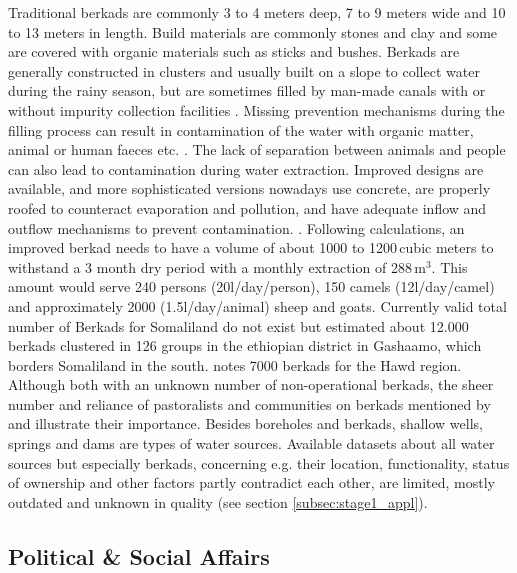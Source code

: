 Traditional berkads are commonly 3 to 4 meters deep, 7 to 9 meters wide and 10 to 13 meters in length. Build materials are commonly stones and clay and some are covered with organic materials such as sticks and bushes. Berkads are generally constructed in clusters and usually built on a slope to collect water during the rainy season, but are sometimes filled by man-made canals with or without impurity collection facilities \autocite{walkerChangingPastoralismEthiopian1998}. Missing prevention mechanisms during the filling process can result in contamination of the water with organic matter, animal or human faeces etc. \autocite{mercycorpsIMPROVEDBERKADDESIGNS2017}. The lack of separation between animals and people can also lead to contamination during water extraction. Improved designs are available, and more sophisticated versions nowadays use concrete, are properly roofed to counteract evaporation and pollution, and have adequate inflow and outflow mechanisms to prevent contamination. \autocite{mercycorpsIMPROVEDBERKADDESIGNS2017, petrucciLandscapeLandformsNorthern2022}. Following \autocite{mercycorpsIMPROVEDBERKADDESIGNS2017} calculations, an improved berkad needs to have a volume of about 1000 to 1200\,cubic meters to withstand a 3 month dry period with a monthly extraction of 288\,m$^3$. This amount would serve 240 persons (20l/day/person), 150 camels (12l/day/camel) and approximately 2000 (1.5l/day/animal) sheep and goats. Currently valid total number of Berkads for Somaliland do not exist but \autocite{walkerChangingPastoralismEthiopian1998} estimated about 12.000 berkads clustered in 126 groups in the ethiopian district in Gashaamo, which borders Somaliland in the south. \autocite{birchSomalilandSomaliRegion2008} notes 7000 berkads for the Hawd region. Although both with an unknown number of non-operational berkads, the sheer number and reliance of pastoralists and communities on berkads mentioned by \autocite{walkerChangingPastoralismEthiopian1998} and \autocite{birchSomalilandSomaliRegion2008} illustrate their importance. Besides boreholes and berkads, shallow wells, springs and dams are types of water sources. Available datasets about all water sources but especially berkads, concerning e.g. their location, functionality, status of ownership and other factors partly contradict each other, are limited, mostly outdated and unknown in quality (see section \ref{subsec:stage1_appl})\autocite{FAOSWALIMSomalia}. 

\subsection{Political \& Social Affairs} %

